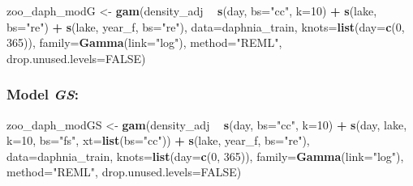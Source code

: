 \documentclass[12pt]{article}
\newenvironment{Shaded}{\begin{snugshade}}{\end{snugshade}}
\newcommand{\KeywordTok}[1]{\textcolor[rgb]{0.13,0.29,0.53}{\textbf{#1}}}
\newcommand{\DataTypeTok}[1]{\textcolor[rgb]{0.13,0.29,0.53}{#1}}
\newcommand{\DecValTok}[1]{\textcolor[rgb]{0.00,0.00,0.81}{#1}}
\newcommand{\StringTok}[1]{\textcolor[rgb]{0.31,0.60,0.02}{#1}}
\newcommand{\OtherTok}[1]{\textcolor[rgb]{0.56,0.35,0.01}{#1}}
\newcommand{\OperatorTok}[1]{\textcolor[rgb]{0.81,0.36,0.00}{\textbf{#1}}}
\newcommand{\NormalTok}[1]{#1}
\begin{document}
\begin{Shaded}
\begin{Highlighting}[]
\NormalTok{zoo_daph_modG <-}\StringTok{ }\KeywordTok{gam}\NormalTok{(density_adj }\OperatorTok{~}\StringTok{ }\KeywordTok{s}\NormalTok{(day, }\DataTypeTok{bs=}\StringTok{"cc"}\NormalTok{, }\DataTypeTok{k=}\DecValTok{10}\NormalTok{) }\OperatorTok{+}\StringTok{ }\KeywordTok{s}\NormalTok{(lake, }\DataTypeTok{bs=}\StringTok{"re"}\NormalTok{) }\OperatorTok{+}
\StringTok{                       }\KeywordTok{s}\NormalTok{(lake, year_f, }\DataTypeTok{bs=}\StringTok{"re"}\NormalTok{),}
                     \DataTypeTok{data=}\NormalTok{daphnia_train, }\DataTypeTok{knots=}\KeywordTok{list}\NormalTok{(}\DataTypeTok{day=}\KeywordTok{c}\NormalTok{(}\DecValTok{0}\NormalTok{, }\DecValTok{365}\NormalTok{)),}
                     \DataTypeTok{family=}\KeywordTok{Gamma}\NormalTok{(}\DataTypeTok{link=}\StringTok{"log"}\NormalTok{), }\DataTypeTok{method=}\StringTok{"REML"}\NormalTok{,}
                     \DataTypeTok{drop.unused.levels=}\OtherTok{FALSE}\NormalTok{)}
\end{Highlighting}
\end{Shaded}

\subsubsection{\texorpdfstring{Model
\emph{GS}:}{Model GS:}}\label{model-gs}

\begin{Shaded}
\begin{Highlighting}[]
\NormalTok{zoo_daph_modGS <-}\StringTok{ }\KeywordTok{gam}\NormalTok{(density_adj }\OperatorTok{~}\StringTok{ }\KeywordTok{s}\NormalTok{(day, }\DataTypeTok{bs=}\StringTok{"cc"}\NormalTok{, }\DataTypeTok{k=}\DecValTok{10}\NormalTok{) }\OperatorTok{+}
\StringTok{                        }\KeywordTok{s}\NormalTok{(day, lake, }\DataTypeTok{k=}\DecValTok{10}\NormalTok{, }\DataTypeTok{bs=}\StringTok{"fs"}\NormalTok{, }\DataTypeTok{xt=}\KeywordTok{list}\NormalTok{(}\DataTypeTok{bs=}\StringTok{"cc"}\NormalTok{)) }\OperatorTok{+}
\StringTok{                        }\KeywordTok{s}\NormalTok{(lake, year_f, }\DataTypeTok{bs=}\StringTok{"re"}\NormalTok{),}
                      \DataTypeTok{data=}\NormalTok{daphnia_train, }\DataTypeTok{knots=}\KeywordTok{list}\NormalTok{(}\DataTypeTok{day=}\KeywordTok{c}\NormalTok{(}\DecValTok{0}\NormalTok{, }\DecValTok{365}\NormalTok{)),}
                      \DataTypeTok{family=}\KeywordTok{Gamma}\NormalTok{(}\DataTypeTok{link=}\StringTok{"log"}\NormalTok{), }\DataTypeTok{method=}\StringTok{"REML"}\NormalTok{,}
                      \DataTypeTok{drop.unused.levels=}\OtherTok{FALSE}\NormalTok{)}
\end{Highlighting}
\end{Shaded}
\end{document}
